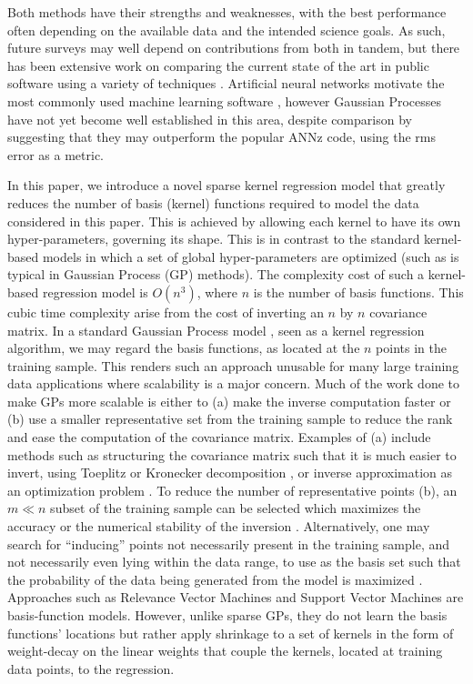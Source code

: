 \documentclass[useAMS,usenatbib,fleqn]{mn2e}
\begin{document}
Both methods have their strengths and weaknesses, with the best performance often depending on the available data and the intended science goals. As such, future surveys may well depend on contributions from both in tandem, but there has been extensive work on comparing the current state of the art in public software using a variety of techniques \citep{hildebrandt10,abdalla11,sanchez14,bonnett2015}. Artificial neural networks motivate the most commonly used machine learning software \citep{Firth2003,vanzella2004photometric,brescia2014catalogue}, however Gaussian Processes \citep[e.g.][]{Way2009} have not yet become well established in this area, despite comparison by \citet{bonfield10} suggesting that they may outperform the popular {\sc ANNz} code, using the rms error as a metric. 


In this paper, we introduce a novel sparse kernel regression model that greatly reduces the number of basis (kernel) functions required to model the data considered in this paper. This is achieved by allowing each kernel to have its own hyper-parameters, governing its shape. This is in contrast to the standard kernel-based models in which a set of global hyper-parameters are optimized (such as is typical in Gaussian Process (GP) methods). The complexity cost of such a kernel-based regression model is $O\left(n^{3}\right)$, where $n$ is the number of basis functions. This cubic time complexity arise from the cost of inverting an $n$ by $n$ covariance matrix. In a standard Gaussian Process model \citep{rasmussen2006gaussian}, seen as a kernel regression algorithm, we may regard the basis functions, as located at the $n$ points in the training sample. This renders such an approach unusable for many large training data applications where scalability is a major concern. Much of the work done to make GPs more scalable is either to (a) make the inverse computation faster or (b) use a smaller representative set from the training sample to reduce the rank and ease the computation of the covariance matrix. Examples of (a) include methods such as structuring the covariance matrix such that it is much easier to invert, using Toeplitz \citep{zhang2005time} or Kronecker decomposition \citep{tsiligkaridis2013}, or inverse approximation as an optimization problem \citep{gibbs97}. To reduce the number of representative points (b), an $m \ll n$ subset of the training sample can be selected which maximizes the accuracy or the numerical stability of the inversion \citep{foster2009}. Alternatively, one may search for ``inducing'' points not necessarily present in the training sample, and not necessarily even lying within the data range, to use as the basis set such that the probability of the data being generated from the model is maximized \citep{snelson2005}. Approaches such as Relevance Vector Machines \citep[RVM;][]{tipping2001} and Support Vector Machines \citep[SVM;][]{smola1997} are basis-function models. However, unlike sparse GPs, they do not learn the basis functions' locations but rather apply shrinkage to a set of kernels in the form of weight-decay on the linear weights that couple the kernels, located at training data points, to the regression. 
\end{document}
